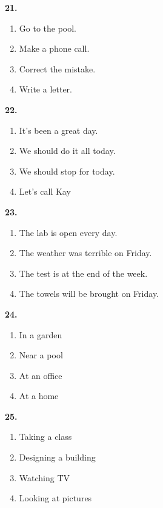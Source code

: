 \documentclass[12pt]{article}
\begin{document}
\par
\vspace{0.25\baselineskip}
\noindent\textbf{21.}
\begin{enumerate}[label=(\Alph*),leftmargin=*,itemsep=0.2em]
\item Go to the pool.
\item Make a phone call.
\item Correct the mistake.
\item Write a letter.
\end{enumerate}
\par
\vspace{0.25\baselineskip}
\noindent\textbf{22.}
\begin{enumerate}[label=(\Alph*),leftmargin=*,itemsep=0.2em]
\item It's been a great day.
\item We should do it all today.
\item We should stop for today.
\item Let's call Kay
\end{enumerate}
\par
\vspace{0.25\baselineskip}
\noindent\textbf{23.}
\begin{enumerate}[label=(\Alph*),leftmargin=*,itemsep=0.2em]
\item The lab is open every day.
\item The weather was terrible on Friday.
\item The test is at the end of the week.
\item The towels will be brought on Friday.
\end{enumerate}
\par
\vspace{0.25\baselineskip}
\noindent\textbf{24.}
\begin{enumerate}[label=(\Alph*),leftmargin=*,itemsep=0.2em]
\item In a garden
\item Near a pool
\item At an office
\item At a home
\end{enumerate}
\par
\vspace{0.25\baselineskip}
\noindent\textbf{25.}
\begin{enumerate}[label=(\Alph*),leftmargin=*,itemsep=0.2em]
\item Taking a class
\item Designing a building
\item Watching TV
\item Looking at pictures
\end{enumerate}
\end{document}

